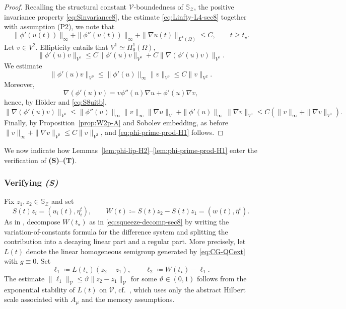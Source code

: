 \documentclass[12pt,leqno]{amsart}
\theoremstyle{definition}
\numberwithin{equation}{section}
\numberwithin{figure}{section}
\begin{document}
\begin{proof} Recalling the structural constant $\mathcal V $-boundedness of $\mathbb S_{\mathcal Z}$, the positive invariance property \eqref{eq:Sinvariance8}, the estimate \eqref{eq:Linfty-L4-sec8} together with assumption (P2), we note that 
\begin{equation}
	\label{eq:S8uitb}
\|\phi'(u(t))\|_{\infty}+\|\phi''(u(t))\|_{\infty}
+ \|\nabla u(t)\|_{L^4(\Omega)}
\le C,    \qquad t\geq t_\star.
\end{equation}
Let $v\in {V^2}$. Ellipticity entails that  ${V^1}\simeq H^1_0(\Omega)$,
\[
\|\phi'(u)v\|_{{V^1}}\leq C\|\phi'(u)v\|_{V^0}+ C\|\nabla(\phi'(u)v)\|_{V^0}.
\]
We estimate
\[
\|\phi'(u)v\|_{V^0}\le \|\phi'(u)\|_{\infty}\|v\|_{V^0}\le C\|v\|_{{V^2}}.
\]
Moreover,
\[
\nabla(\phi'(u)v)=v\phi''(u)\nabla u+\phi'(u)\nabla v,
\]
hence, by H\"older and \eqref{eq:S8uitb}, \[
\|\nabla(\phi'(u)v)\|_{V^0}
\le \|\phi''(u)\|_\infty\|v\|_{\infty}\|\nabla u\|_{V^0}
+\|\phi'(u)\|_\infty\,\|\nabla v\|_{V^0}
\le C\left(\|v\|_{\infty}+\|\nabla v\|_{V^0}\right).
\]
Finally, by Proposition~\ref{prop:W2p-A} and Sobolev embedding, as before
$\|v\|_{\infty}+\|\nabla v\|_{V^0}\le C\|v\|_{{V^2}}$,
and \eqref{eq:phi-prime-prod-H1} follows.
\end{proof}


We now indicate how Lemmas~\ref{lem:phi-lip-H2}--\ref{lem:phi-prime-prod-H1} enter the verification of
\textbf{(S)}--\textbf{(T)}. 

\subsubsection*{Verifying \textbf{\emph{(S)}}}
Fix $z_1,z_2\in \mathbb S_{\mathcal Z}$ and set
\[
S(t)z_i=(u_i(t),\eta_i^t),\qquad W(t)\coloneqq S(t)z_2-S(t)z_1=(w(t),\bar\eta^t).
\]
As in \cite[\S8]{CGDP2010}, decompose $W(t_\star)$ as in \eqref{eq:squeeze-decomp-sec8} by writing the variation-of-constants
formula for the difference system and splitting the contribution into a decaying linear part and a regular part.
More precisely, let $L(t)$ denote the linear homogeneous semigroup generated by  \eqref{eq:CG-QCext} with $g\equiv 0$. Set
\[
\ell_1 \coloneqq L(t_\star)\left(z_2-z_1\right),
\qquad
\ell_2 \coloneqq W(t_\star)-\ell_1.
\]
The estimate $\|\ell_1\|_{\mathcal V}\le \vartheta\|z_2-z_1\|_{\mathcal V}$ for some $\vartheta\in(0,1)$ follows from
the exponential stability of $L(t)$ on $\mathcal V$, cf.\ \cite[Prop.~6.5]{CGDP2010}, which uses only the abstract Hilbert scale
associated with $A_\mu$ and the memory assumptions.
\end{document}
